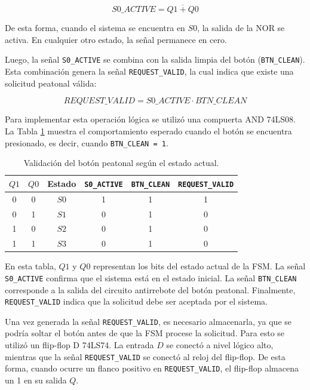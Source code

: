 \documentclass[12pt,onecolumn]{IEEEtran}
\begin{document}
\begin{equation}
    S0\_ACTIVE = \overline{Q1 + Q0}
\end{equation}

De esta forma, cuando el sistema se encuentra en $S0$, la salida de la NOR se activa. En cualquier otro estado, la señal permanece en cero.

Luego, la señal \texttt{S0\_ACTIVE} se combina con la salida limpia del botón (\texttt{BTN\_CLEAN}). Esta combinación genera la señal \texttt{REQUEST\_VALID}, la cual indica que existe una solicitud peatonal válida:

\begin{equation}
    REQUEST\_VALID = S0\_ACTIVE \cdot BTN\_CLEAN
\end{equation}

Para implementar esta operación lógica se utilizó una compuerta AND 74LS08. La Tabla \ref{tab:request_valid} muestra el comportamiento esperado cuando el botón se encuentra presionado, es decir, cuando \texttt{BTN\_CLEAN = 1}.

\begin{table}[H]
    \centering
    \caption{Validación del botón peatonal según el estado actual.}
    \begin{tabular}{|c|c|c|c|c|c|}
        \hline
        $Q1$ & $Q0$ & Estado & \texttt{S0\_ACTIVE} & \texttt{BTN\_CLEAN} & \texttt{REQUEST\_VALID} \\
        \hline
        0 & 0 & $S0$ & 1 & 1 & 1 \\
        \hline
        0 & 1 & $S1$ & 0 & 1 & 0 \\
        \hline
        1 & 0 & $S2$ & 0 & 1 & 0 \\
        \hline
        1 & 1 & $S3$ & 0 & 1 & 0 \\
        \hline
    \end{tabular}
    \label{tab:request_valid}
\end{table}

En esta tabla, $Q1$ y $Q0$ representan los bits del estado actual de la FSM. La señal \texttt{S0\_ACTIVE} confirma que el sistema está en el estado inicial. La señal \texttt{BTN\_CLEAN} corresponde a la salida del circuito antirrebote del botón peatonal. Finalmente, \texttt{REQUEST\_VALID} indica que la solicitud debe ser aceptada por el sistema.

Una vez generada la señal \texttt{REQUEST\_VALID}, es necesario almacenarla, ya que se podría soltar el botón antes de que la FSM procese la solicitud. Para esto se utilizó un flip-flop D 74LS74. La entrada $D$ se conectó a nivel lógico alto, mientras que la señal \texttt{REQUEST\_VALID} se conectó al reloj del flip-flop. De esta forma, cuando ocurre un flanco positivo en \texttt{REQUEST\_VALID}, el flip-flop almacena un 1 en su salida $Q$.
\end{document}
